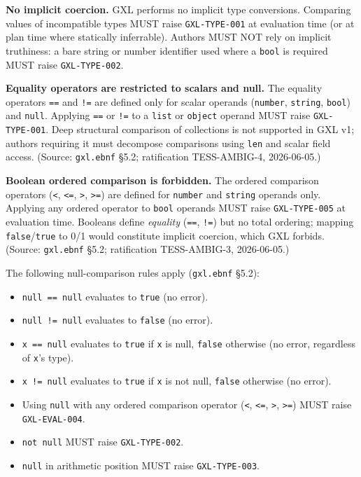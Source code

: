 \noindent\textbf{No implicit coercion.}
GXL performs no implicit type conversions.
Comparing values of incompatible types MUST raise \texttt{GXL-TYPE-001}
at evaluation time (or at plan time where statically inferrable).
Authors MUST NOT rely on implicit truthiness:
a bare string or number identifier used where a \texttt{bool} is required
MUST raise \texttt{GXL-TYPE-002}.

\noindent\textbf{Equality operators are restricted to scalars and null.}
The equality operators \texttt{==} and \texttt{!=} are defined only for
scalar operands (\texttt{number}, \texttt{string}, \texttt{bool}) and
\texttt{null}.
Applying \texttt{==} or \texttt{!=} to a \texttt{list} or \texttt{object}
operand MUST raise \texttt{GXL-TYPE-001}.
Deep structural comparison of collections is not supported in GXL v1;
authors requiring it must decompose comparisons using \texttt{len} and
scalar field access.
(Source: \texttt{gxl.ebnf} \S5.2; ratification TESS-AMBIG-4, 2026-06-05.)

\noindent\textbf{Boolean ordered comparison is forbidden.}
The ordered comparison operators (\texttt{<}, \texttt{<=}, \texttt{>},
\texttt{>=}) are defined for \texttt{number} and \texttt{string} operands
only.
Applying any ordered operator to \texttt{bool} operands MUST raise
\texttt{GXL-TYPE-005} at evaluation time.
Booleans define \emph{equality} (\texttt{==}, \texttt{!=}) but no total
ordering; mapping \texttt{false}/\texttt{true} to 0/1 would constitute
implicit coercion, which GXL forbids.
(Source: \texttt{gxl.ebnf} \S5.2; ratification TESS-AMBIG-3, 2026-06-05.)

\noindent The following null-comparison rules apply
(\texttt{gxl.ebnf} \S5.2):

\begin{itemize}
  \item \texttt{null == null} evaluates to \texttt{true} (no error).
  \item \texttt{null != null} evaluates to \texttt{false} (no error).
  \item \texttt{x == null} evaluates to \texttt{true} if \texttt{x} is null,
    \texttt{false} otherwise (no error, regardless of \texttt{x}'s type).
  \item \texttt{x != null} evaluates to \texttt{true} if \texttt{x} is not null,
    \texttt{false} otherwise (no error).
  \item Using \texttt{null} with any ordered comparison operator
    (\texttt{<}, \texttt{<=}, \texttt{>}, \texttt{>=}) MUST raise
    \texttt{GXL-EVAL-004}.
  \item \texttt{not null} MUST raise \texttt{GXL-TYPE-002}.
  \item \texttt{null} in arithmetic position MUST raise \texttt{GXL-TYPE-003}.
\end{itemize}

